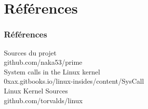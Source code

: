 \documentclass{beamer}
\begin{document}
\section{Références}

\begin{frame}[allowframebreaks]
\frametitle{Références}
\begin{thebibliography}{1}
	Sources du projet\\
	github.com/naka53/prime\\

	System calls in the Linux kernel\\
	0xax.gitbooks.io/linux-insides/content/SysCall\\

	Linux Kernel Sources\\
	github.com/torvalds/linux\\
\end{thebibliography}
\end{frame}
\end{document}
